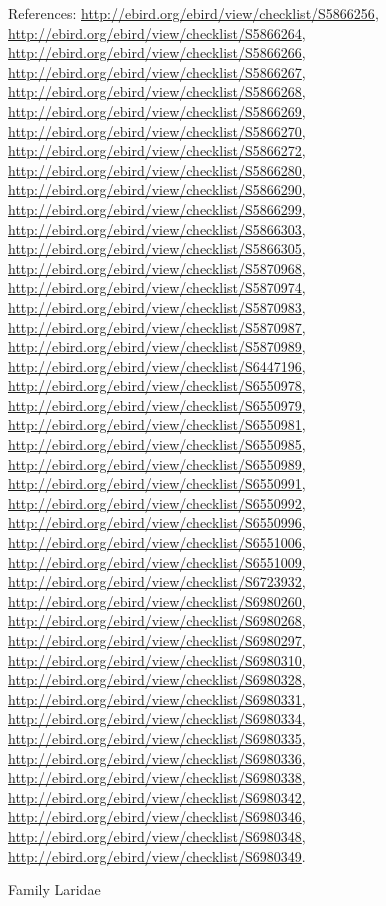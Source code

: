 \documentclass[9pt, article]{memoir}
\begin{document}
\begin{multicols}{2}
\vspace{6pt}References: 
\url{http://ebird.org/ebird/view/checklist/S5866256}, 
\url{http://ebird.org/ebird/view/checklist/S5866264}, 
\url{http://ebird.org/ebird/view/checklist/S5866266}, 
\url{http://ebird.org/ebird/view/checklist/S5866267}, 
\url{http://ebird.org/ebird/view/checklist/S5866268}, 
\url{http://ebird.org/ebird/view/checklist/S5866269}, 
\url{http://ebird.org/ebird/view/checklist/S5866270}, 
\url{http://ebird.org/ebird/view/checklist/S5866272}, 
\url{http://ebird.org/ebird/view/checklist/S5866280}, 
\url{http://ebird.org/ebird/view/checklist/S5866290}, 
\url{http://ebird.org/ebird/view/checklist/S5866299}, 
\url{http://ebird.org/ebird/view/checklist/S5866303}, 
\url{http://ebird.org/ebird/view/checklist/S5866305}, 
\url{http://ebird.org/ebird/view/checklist/S5870968}, 
\url{http://ebird.org/ebird/view/checklist/S5870974}, 
\url{http://ebird.org/ebird/view/checklist/S5870983}, 
\url{http://ebird.org/ebird/view/checklist/S5870987}, 
\url{http://ebird.org/ebird/view/checklist/S5870989}, 
\url{http://ebird.org/ebird/view/checklist/S6447196}, 
\url{http://ebird.org/ebird/view/checklist/S6550978}, 
\url{http://ebird.org/ebird/view/checklist/S6550979}, 
\url{http://ebird.org/ebird/view/checklist/S6550981}, 
\url{http://ebird.org/ebird/view/checklist/S6550985}, 
\url{http://ebird.org/ebird/view/checklist/S6550989}, 
\url{http://ebird.org/ebird/view/checklist/S6550991}, 
\url{http://ebird.org/ebird/view/checklist/S6550992}, 
\url{http://ebird.org/ebird/view/checklist/S6550996}, 
\url{http://ebird.org/ebird/view/checklist/S6551006}, 
\url{http://ebird.org/ebird/view/checklist/S6551009}, 
\url{http://ebird.org/ebird/view/checklist/S6723932}, 
\url{http://ebird.org/ebird/view/checklist/S6980260}, 
\url{http://ebird.org/ebird/view/checklist/S6980268}, 
\url{http://ebird.org/ebird/view/checklist/S6980297}, 
\url{http://ebird.org/ebird/view/checklist/S6980310}, 
\url{http://ebird.org/ebird/view/checklist/S6980328}, 
\url{http://ebird.org/ebird/view/checklist/S6980331}, 
\url{http://ebird.org/ebird/view/checklist/S6980334}, 
\url{http://ebird.org/ebird/view/checklist/S6980335}, 
\url{http://ebird.org/ebird/view/checklist/S6980336}, 
\url{http://ebird.org/ebird/view/checklist/S6980338}, 
\url{http://ebird.org/ebird/view/checklist/S6980342}, 
\url{http://ebird.org/ebird/view/checklist/S6980346}, 
\url{http://ebird.org/ebird/view/checklist/S6980348}, 
\url{http://ebird.org/ebird/view/checklist/S6980349}.

\vspace{6pt}\noindent\hspace{24pt}Family Laridae



\end{multicols}
\end{document}
